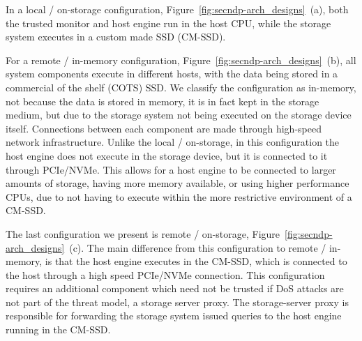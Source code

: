 In a local / on-storage configuration, Figure~\ref{fig:secndp-arch_designs}~(a), both the trusted monitor and host engine run in the host CPU, while the storage system executes in a custom made SSD (CM-SSD).

For a remote / in-memory configuration, Figure~\ref{fig:secndp-arch_designs}~(b), all system components execute in different hosts, with the data being stored in a commercial of the shelf (COTS) SSD. 
We classify the configuration as in-memory, not because the data is stored in memory, it is in fact kept in the storage medium, but due to the storage system not being executed on the storage device itself.
Connections between each component are made through high-speed network infrastructure.
Unlike the local / on-storage, in this configuration the host engine does not execute in the storage device, but it is connected to it through PCIe/NVMe.
This allows for a host engine to be connected to larger amounts of storage, having more memory available, or using higher performance CPUs, due to not having to execute within the more restrictive environment of a CM-SSD. 

The last configuration we present is remote / on-storage, Figure~\ref{fig:secndp-arch_designs}~(c).
The main difference from this configuration to remote / in-memory, is that the host engine executes in the CM-SSD, which is connected to the host through a high speed PCIe/NVMe connection.
This configuration requires an additional component which need not be trusted if DoS attacks are not part of the threat model, a storage server proxy.
The storage-server proxy is responsible for forwarding the storage system issued queries to the host engine running in the CM-SSD.
\fi



